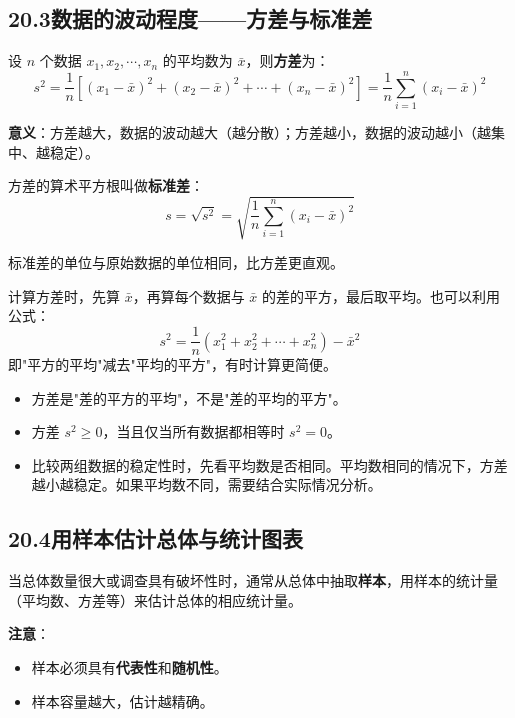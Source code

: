 \documentclass[12pt, a4paper]{ctexart}
\begin{document}
\subsection*{20.3\quad 数据的波动程度——方差与标准差}

\begin{knowledgebox}[方差]
设 $n$ 个数据 $x_1, x_2, \cdots, x_n$ 的平均数为 $\bar{x}$，则\textbf{方差}为：
$$s^2 = \frac{1}{n}\left[(x_1 - \bar{x})^2 + (x_2 - \bar{x})^2 + \cdots + (x_n - \bar{x})^2\right] = \frac{1}{n}\sum_{i=1}^{n}(x_i - \bar{x})^2$$

\textbf{意义}：方差越大，数据的波动越大（越分散）；方差越小，数据的波动越小（越集中、越稳定）。
\end{knowledgebox}

\begin{knowledgebox}[标准差]
方差的算术平方根叫做\textbf{标准差}：
$$s = \sqrt{s^2} = \sqrt{\frac{1}{n}\sum_{i=1}^{n}(x_i - \bar{x})^2}$$

标准差的单位与原始数据的单位相同，比方差更直观。
\end{knowledgebox}

\begin{tipbox}[方差的计算技巧]
计算方差时，先算 $\bar{x}$，再算每个数据与 $\bar{x}$ 的差的平方，最后取平均。也可以利用公式：
$$s^2 = \frac{1}{n}(x_1^2 + x_2^2 + \cdots + x_n^2) - \bar{x}^2$$
即"平方的平均"减去"平均的平方"，有时计算更简便。
\end{tipbox}

\begin{warnbox}[易错提醒]
\begin{itemize}[leftmargin=2em]
  \item 方差是"差的平方的平均"，不是"差的平均的平方"。
  \item 方差 $s^2 \geqslant 0$，当且仅当所有数据都相等时 $s^2 = 0$。
  \item 比较两组数据的稳定性时，先看平均数是否相同。平均数相同的情况下，方差越小越稳定。如果平均数不同，需要结合实际情况分析。
\end{itemize}
\end{warnbox}

\subsection*{20.4\quad 用样本估计总体与统计图表}

\begin{knowledgebox}[用样本估计总体]
当总体数量很大或调查具有破坏性时，通常从总体中抽取\textbf{样本}，用样本的统计量（平均数、方差等）来估计总体的相应统计量。

\textbf{注意}：
\begin{itemize}[leftmargin=2em]
  \item 样本必须具有\textbf{代表性}和\textbf{随机性}。
  \item 样本容量越大，估计越精确。
\end{itemize}
\end{knowledgebox}
\end{document}
